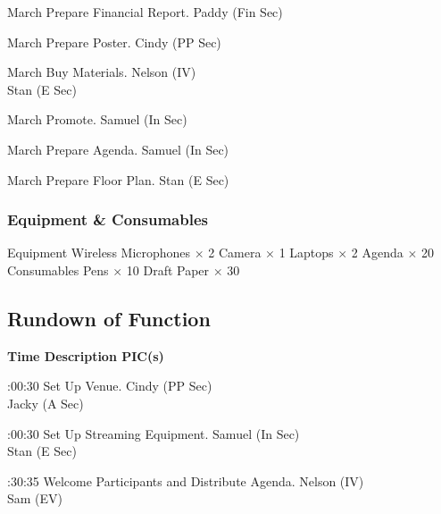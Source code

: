\bTR{}
\eTD{} March
\eTD\bTD Prepare Financial Report.
\eTD\bTD Paddy (Fin Sec)
\eTD\eTR

\bTR{}
\eTD{} March
\eTD\bTD Prepare Poster.
\eTD\bTD Cindy (PP Sec)
\eTD\eTR

\bTR{}
\eTD{} March
\eTD\bTD Buy Materials.
\eTD\bTD Nelson (IV) \\ Stan (E Sec)
\eTD\eTR

\bTR{}
\eTD{} March
\eTD\bTD Promote.
\eTD\bTD Samuel (In Sec)
\eTD\eTR

\bTR{}
\eTD{} March
\eTD\bTD Prepare Agenda.
\eTD\bTD Samuel (In Sec)
\eTD\eTR

\bTR{}
\eTD{} March
\eTD\bTD Prepare Floor Plan.
\eTD\bTD Stan (E Sec)
\eTD\eTR

\eTABLEbody
\eTABLE

\subsubsection{Equipment \& Consumables}
\starttabulate[|l|l|]
\NC{}Equipment\NC\NR
\HL
\NC Wireless Microphones \NC $\times$ 2 \NR
\NC Camera \NC $\times$ 1 \NR
\NC Laptops \NC $\times$ 2 \NR
\NC Agenda \NC $\times$ 20 \NR
\HL
\NR
\NC{}Consumables\NC\NR
\HL
\NC Pens \NC $\times$ 10 \NR
\NC Draft Paper \NC $\times$ 30 \NR
\HL
\stoptabulate

\subsection{Rundown of Function}

\setupTABLE[c][1][width=1.25in]
\setupTABLE[c][2][width=3.5in]
\setupTABLE[c][3][width=1.25in]
\bTABLE
\bTABLEhead

\bTR\bTH    \bf{Time}
\eTH\bTH    \bf{Description}
\eTH\bTH    \bf{PIC(s)}
\eTH\eTR

\eTABLEhead
\bTABLEbody

\bTR{}:00:30
\eTD\bTD Set Up Venue.
\eTD\bTD Cindy (PP Sec) \\ Jacky (A Sec)
\eTD\eTR

\bTR{}:00:30
\eTD\bTD Set Up Streaming Equipment.
\eTD\bTD Samuel (In Sec) \\ Stan (E Sec)
\eTD\eTR

\bTR{}:30:35
\eTD\bTD Welcome Participants and Distribute Agenda.
\eTD\bTD Nelson (IV) \\ Sam (EV)
\eTD\eTR

